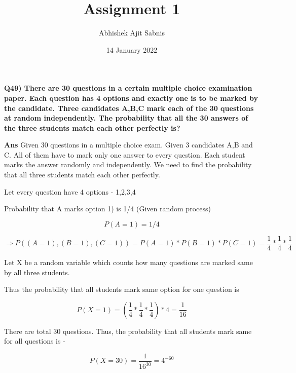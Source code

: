 \documentclass{article}
\title{\textbf{Assignment 1}}
\author{Abhishek Ajit Sabnis}
\date{14 January 2022}
\begin{document}
\maketitle

\textbf{Q49) There are 30 questions in a certain multiple choice examination paper. Each question has 4 options and exactly one is to be marked by the candidate. Three candidates A,B,C mark each of the 30 questions at random independently. The probability that all the 30 answers of the three students match each other perfectly is?}

\vspace{1cm}

\textbf{Ans}  Given 30 questions in a multiple choice exam. Given 3 candidates A,B and C. All of them have to mark only one answer to every question. Each student marks the answer randomly and independently. We need to find the probability that all three students match each other perfectly.

Let every question have 4 options - 1,2,3,4
\vspace{0.5cm}

Probability that A marks option 1) is 1/4 (Given random process)

\begin{equation}
    P(A=1) = 1/4
\end{equation}

\begin{equation}
    \Rightarrow P((A=1) , (B=1) , (C=1)) = P(A=1) * P(B=1) * P(C=1)  
 = \frac{1}{4} * \frac{1}{4} * \frac{1}{4}
\end{equation}

Let X be a random variable which counts how many questions are marked same by all three students. 

Thus the probability that all students mark same option for one question is
\vspace{0.5cm}

 
\begin{equation}
    P(X=1) = (\frac{1}{4} * \frac{1}{4} * \frac{1}{4}) *4 = \frac{1}{16}
\end{equation}

There are total 30 questions. Thus, the probability that all students mark same for all questions is - 

\begin{equation}
     P(X=30) = \frac{1}{16^{30}} = 4^{-60}
\end{equation}
\end{document}
